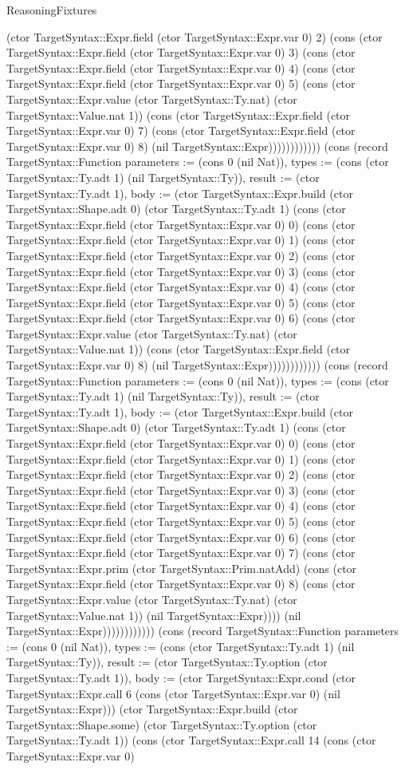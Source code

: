 \begin{lexlean}{ReasoningFixtures}
\begin{semanticmodule}
{(ctor TargetSyntax::Expr.field (ctor TargetSyntax::Expr.var 0) 2) (cons (ctor TargetSyntax::Expr.field (ctor TargetSyntax::Expr.var 0) 3) (cons (ctor TargetSyntax::Expr.field (ctor TargetSyntax::Expr.var 0) 4) (cons (ctor TargetSyntax::Expr.field (ctor TargetSyntax::Expr.var 0) 5) (cons (ctor TargetSyntax::Expr.value (ctor TargetSyntax::Ty.nat) (ctor TargetSyntax::Value.nat 1)) (cons (ctor TargetSyntax::Expr.field (ctor TargetSyntax::Expr.var 0) 7) (cons (ctor TargetSyntax::Expr.field (ctor TargetSyntax::Expr.var 0) 8) (nil TargetSyntax::Expr)))))))))))}) (cons (record TargetSyntax::Function {parameters := (cons 0 (nil Nat)), types := (cons (ctor TargetSyntax::Ty.adt 1) (nil TargetSyntax::Ty)), result := (ctor TargetSyntax::Ty.adt 1), body := (ctor TargetSyntax::Expr.build (ctor TargetSyntax::Shape.adt 0) (ctor TargetSyntax::Ty.adt 1) (cons (ctor TargetSyntax::Expr.field (ctor TargetSyntax::Expr.var 0) 0) (cons (ctor TargetSyntax::Expr.field (ctor TargetSyntax::Expr.var 0) 1) (cons (ctor TargetSyntax::Expr.field (ctor TargetSyntax::Expr.var 0) 2) (cons (ctor TargetSyntax::Expr.field (ctor TargetSyntax::Expr.var 0) 3) (cons (ctor TargetSyntax::Expr.field (ctor TargetSyntax::Expr.var 0) 4) (cons (ctor TargetSyntax::Expr.field (ctor TargetSyntax::Expr.var 0) 5) (cons (ctor TargetSyntax::Expr.field (ctor TargetSyntax::Expr.var 0) 6) (cons (ctor TargetSyntax::Expr.value (ctor TargetSyntax::Ty.nat) (ctor TargetSyntax::Value.nat 1)) (cons (ctor TargetSyntax::Expr.field (ctor TargetSyntax::Expr.var 0) 8) (nil TargetSyntax::Expr)))))))))))}) (cons (record TargetSyntax::Function {parameters := (cons 0 (nil Nat)), types := (cons (ctor TargetSyntax::Ty.adt 1) (nil TargetSyntax::Ty)), result := (ctor TargetSyntax::Ty.adt 1), body := (ctor TargetSyntax::Expr.build (ctor TargetSyntax::Shape.adt 0) (ctor TargetSyntax::Ty.adt 1) (cons (ctor TargetSyntax::Expr.field (ctor TargetSyntax::Expr.var 0) 0) (cons (ctor TargetSyntax::Expr.field (ctor TargetSyntax::Expr.var 0) 1) (cons (ctor TargetSyntax::Expr.field (ctor TargetSyntax::Expr.var 0) 2) (cons (ctor TargetSyntax::Expr.field (ctor TargetSyntax::Expr.var 0) 3) (cons (ctor TargetSyntax::Expr.field (ctor TargetSyntax::Expr.var 0) 4) (cons (ctor TargetSyntax::Expr.field (ctor TargetSyntax::Expr.var 0) 5) (cons (ctor TargetSyntax::Expr.field (ctor TargetSyntax::Expr.var 0) 6) (cons (ctor TargetSyntax::Expr.field (ctor TargetSyntax::Expr.var 0) 7) (cons (ctor TargetSyntax::Expr.prim (ctor TargetSyntax::Prim.natAdd) (cons (ctor TargetSyntax::Expr.field (ctor TargetSyntax::Expr.var 0) 8) (cons (ctor TargetSyntax::Expr.value (ctor TargetSyntax::Ty.nat) (ctor TargetSyntax::Value.nat 1)) (nil TargetSyntax::Expr)))) (nil TargetSyntax::Expr)))))))))))}) (cons (record TargetSyntax::Function {parameters := (cons 0 (nil Nat)), types := (cons (ctor TargetSyntax::Ty.adt 1) (nil TargetSyntax::Ty)), result := (ctor TargetSyntax::Ty.option (ctor TargetSyntax::Ty.adt 1)), body := (ctor TargetSyntax::Expr.cond (ctor TargetSyntax::Expr.call 6 (cons (ctor TargetSyntax::Expr.var 0) (nil TargetSyntax::Expr))) (ctor TargetSyntax::Expr.build (ctor TargetSyntax::Shape.some) (ctor TargetSyntax::Ty.option (ctor TargetSyntax::Ty.adt 1)) (cons (ctor TargetSyntax::Expr.call 14 (cons (ctor TargetSyntax::Expr.var 0) }
\end{semanticmodule}
\end{lexlean}
